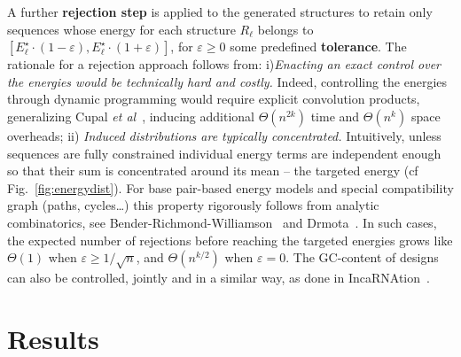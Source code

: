 \documentclass{bioinfo}
\newcommand{\Def}[1]{{\bf #1}}
\newcommand{\TargetE}{E^{\star}}
\newcommand{\Nuc}[1]{{\sf #1}}
\newcommand{\Cb}{\Nuc{C}}
\newcommand{\Gb}{\Nuc{G}}
\newcommand{\Software}[1]{{\ttfamily #1}}
\begin{document}
A further \Def{rejection step} is applied to the generated structures to retain only sequences whose energy for each structure $R_\ell$ belongs to $[\TargetE_\ell\cdot(1-\varepsilon),\TargetE_\ell\cdot(1+\varepsilon)]$, for $\varepsilon\ge 0$ some predefined \Def{tolerance}. The rationale for a rejection approach follows from: 
i)\emph{Enacting an exact control over the energies would  be technically hard and costly.} Indeed, controlling the energies through dynamic programming would require explicit convolution products, generalizing Cupal \emph{et al}~\cite{Cupal1996}, inducing additional $\Theta(n^{2k})$ time and $\Theta(n^k)$ space overheads;
ii) \emph{Induced distributions are typically concentrated.} Intuitively, unless sequences are fully constrained individual energy terms are independent enough so that their sum is concentrated around its mean -- the targeted energy (cf Fig.~\ref{fig:energydist}). 
For base pair-based energy models and special compatibility graph (paths, cycles\ldots) this property rigorously follows from analytic combinatorics, see Bender-Richmond-Williamson~\cite{Bender1983} and Drmota~\cite{Drmota1997}. In such cases, the expected number of rejections before reaching the targeted energies grows like $\Theta(1)$ when $\varepsilon\ge 1/\sqrt{n}$, and $\Theta(n^{k/2})$ when $\varepsilon=0$. The \Gb\Cb-content of designs can also be controlled, jointly and in a similar way, as done in \Software{IncaRNAtion}~\cite{Reinharz2013}.


\section{Results}\label{sec:results}
\end{document}
